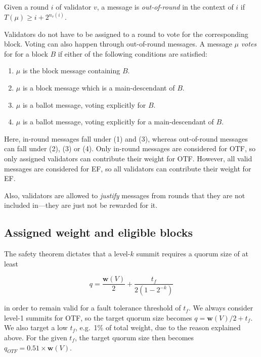 \documentclass[12pt]{article}
\begin{document}
Given a round $i$ of validator $v$, a message is \emph{out-of-round} in the context of $i$ if $T(\mu)\geq i+2^{n_v(i)}$.

Validators do not have to be assigned to a round to vote for the corresponding block. Voting can also happen through out-of-round messages. A message $\mu$ \emph{votes} for for a block $B$ if either of the following conditions are satisfied:

\begin{enumerate}
\def\labelenumi{\arabic{enumi}.}
\item $\mu$ is the block message containing $B$.
\item $\mu$ is a block message which is a main-descendant of $B$.
\item $\mu$ is a ballot message, voting explicitly for $B$.
\item $\mu$ is a ballot message, voting explicitly for a main-descendant of $B$.
\end{enumerate}

Here, in-round messages fall under (1) and (3), whereas out-of-round messages can fall under (2), (3) or (4). Only in-round messages are considered for OTF, so only assigned validators can contribute their weight for OTF. However, all valid messages are considered for EF, so all validators can contribute their weight for EF.

Also, validators are allowed to \emph{justify} messages from rounds that they are not included in---they are just not be rewarded for it.

\subsection{Assigned weight and eligible blocks}
\label{assigned-weight-and-eligible-blocks}

The safety theorem dictates that a level-$k$ summit requires a quorum size of at least

\begin{equation}
q = \frac{\boldsymbol{w}(V)}{2} + \frac{t_f}{2(1-2^{-k})}
\end{equation}

in order to remain valid for a fault tolerance threshold of $t_f$. We always consider level-1 summits for OTF, so the target quorum size becomes $q=\boldsymbol{w}(V)/2+t_f$. We also target a low $t_f$, e.g.~1\% of total weight, due to the reason explained above. For the given $t_f$, the target quorum size then becomes $q_{OTF} = 0.51 \times \boldsymbol{w}(V)$.
\end{document}
